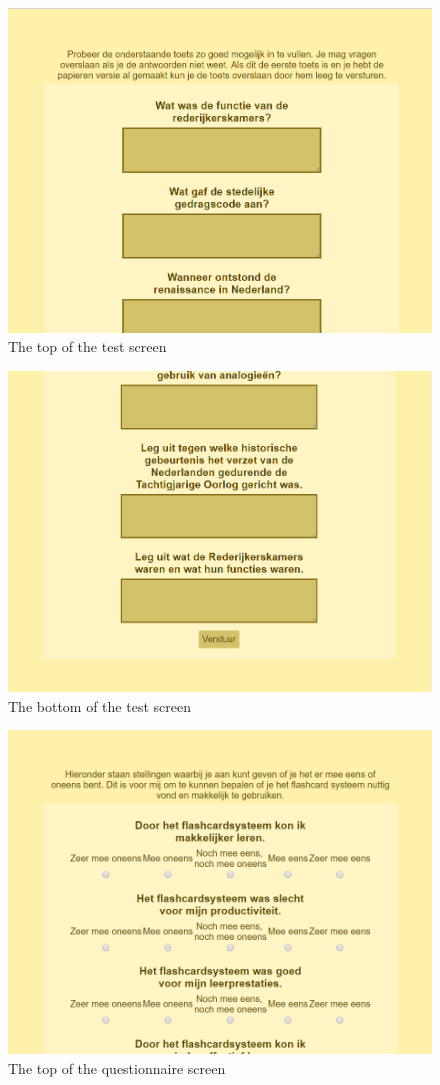 \begin{figure}
    \centering
    \includegraphics[width=.8\textwidth]{img/ui_test_top.png}
    \caption{The top of the test screen}
    \label{fig:ui_test_top}
\end{figure}

\begin{figure}
    \centering
    \includegraphics[width=.8\textwidth]{img/ui_test_bottom.png}
    \caption{The bottom of the test screen}
    \label{fig:ui_test_bottom}
\end{figure}

\begin{figure}
    \centering
    \includegraphics[width=.8\textwidth]{img/ui_questionnaire_top.png}
    \caption{The top of the questionnaire screen}
    \label{fig:ui_questionnaire_top}
\end{figure}

